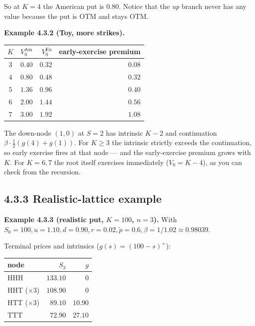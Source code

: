\documentclass[
  10pt,
  twoside]{book}
\newcounter{none} %
\begin{document}
So at \(K = 4\) the American put is \(0.80\). Notice that the \emph{up}
branch never has any value because the put is OTM and stays OTM.

\textbf{Example 4.3.2 (Toy, more strikes).}

{\def\LTcaptype{none} %
\begin{table}[H]
\centering
\begin{tabular}{|c|r|r|r|}
\toprule
\(K\) & \(V_0^{\text{Am}}\) & \(V_0^{\text{Eu}}\) & early-exercise
premium \\
\midrule



\(3\) & \(0.40\) & \(0.32\) & \(0.08\) \\
\(4\) & \(0.80\) & \(0.48\) & \(0.32\) \\
\(5\) & \(1.36\) & \(0.96\) & \(0.40\) \\
\(6\) & \(2.00\) & \(1.44\) & \(0.56\) \\
\(7\) & \(3.00\) & \(1.92\) & \(1.08\) \\
\bottomrule
\end{tabular}
\end{table}
}

The down-node \((1, 0)\) at \(S = 2\) has intrinsic \(K-2\) and
continuation \(\beta\cdot\tfrac{1}{2}(g(4)+g(1))\). For \(K \ge 3\) the
intrinsic strictly exceeds the continuation, so early exercise fires at
that node --- and the early-exercise premium grows with \(K\). For
\(K = 6, 7\) the root itself exercises immediately (\(V_0 = K - 4\)), as
you can check from the recursion.

\subsection{4.3.3 Realistic-lattice
example}\label{realistic-lattice-example}

\textbf{Example 4.3.3 (realistic put, \(K = 100\), \(n = 3\)).} With
\(S_0 = 100, u = 1.10, d = 0.90, r = 0.02, \tilde p = 0.6, \beta = 1/1.02 \approx 0.98039\).

Terminal prices and intrinsics (\(g(s) = (100-s)^+\)):

{\def\LTcaptype{none} %
\begin{table}[H]
\centering
\begin{tabular}{|l|r|r|}
\toprule
node & \(S_3\) & \(g\) \\
\midrule



HHH & \(133.10\) & \(0\) \\
HHT (×3) & \(108.90\) & \(0\) \\
HTT (×3) & \(89.10\) & \(10.90\) \\
TTT & \(72.90\) & \(27.10\) \\
\bottomrule
\end{tabular}
\end{table}
}
\end{document}

